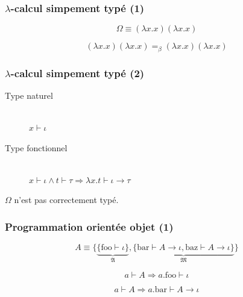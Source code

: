 \documentclass[14pt,utf8x,hyperref={pdfpagelabels=false}]{beamer}
\begin{document}
\begin{slideDecision}
  \begin{changeleftmargin}{1.1cm}
    \frametitle{$\lambda$-calcul simpement typé (1)}

    \begin{equation*}
      \Omega \equiv (\lambda x . x) (\lambda x . x)
    \end{equation*}

    \begin{equation*}
      (\lambda x . x) (\lambda x . x) =_\beta (\lambda x . x) (\lambda x . x)
    \end{equation*}
  \end{changeleftmargin}
\end{slideDecision}

\begin{slideDecision}
  \begin{changeleftmargin}{1.1cm}
    \frametitle{$\lambda$-calcul simpement typé (2)}

    \begin{description}
    \item[Type naturel]~\\
      $x \vdash \iota$
    \item[Type fonctionnel]~\\
      $x \vdash \iota \wedge t \vdash \tau \Rightarrow \lambda x. t \vdash \iota \rightarrow \tau$
    \end{description}

    \bigskip

    $\Omega$ n'est pas correctement typé.

  \end{changeleftmargin}
\end{slideDecision}

\begin{slideDecision}
  \begin{changeleftmargin}{1.1cm}
    \frametitle{Programmation orientée objet (1)}

    \begin{equation*}
      A \equiv \{ \underbrace{\{ \text{foo} \vdash \iota
        \}}_{\mathfrak{A}}, \underbrace{\{ \text{bar} \vdash A
        \rightarrow \iota, \text{baz} \vdash A \rightarrow \iota
        \}}_{\mathfrak{M}} \}
    \end{equation*}

    \begin{equation*}
      a \vdash A \Rightarrow a.\text{foo} \vdash \iota
    \end{equation*}

    \begin{equation*}
      a \vdash A \Rightarrow a.\text{bar} \vdash A \rightarrow \iota
    \end{equation*}
  \end{changeleftmargin}
\end{slideDecision}
\end{document}
